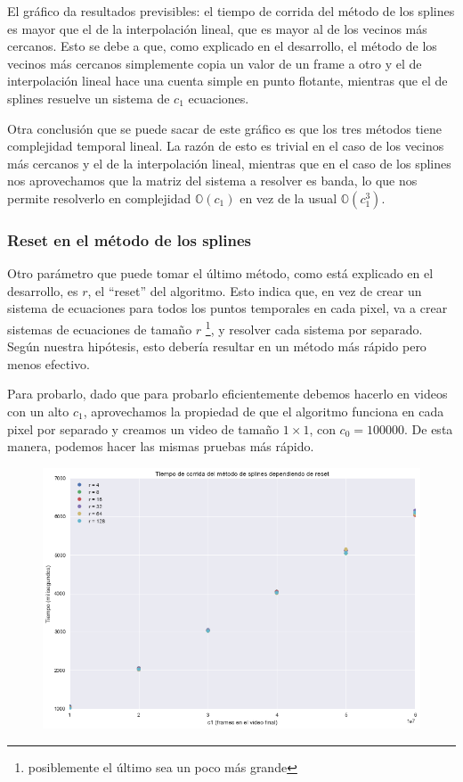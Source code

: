 El gr\'afico da resultados previsibles: el tiempo de corrida del m\'etodo de los
splines es mayor que el de la interpolaci\'on lineal, que es mayor al de los
vecinos m\'as cercanos. Esto se debe a que, como explicado en el desarrollo,
el m\'etodo de los vecinos m\'as cercanos simplemente copia un valor de un
frame a otro y el de interpolaci\'on lineal hace una cuenta simple en punto
flotante, mientras que el de splines resuelve un sistema de $c_1$ ecuaciones.

Otra conclusi\'on que se puede sacar de este gr\'afico es que los tres m\'etodos
tiene complejidad temporal lineal. La raz\'on de esto es trivial en el caso de los
vecinos m\'as cercanos y el de la interpolaci\'on lineal, mientras que en el
caso de los splines nos aprovechamos que la matriz del sistema a resolver es
banda, lo que nos permite resolverlo en complejidad $\mathbb{O}(c_1)$ en vez de
la usual $\mathbb{O}(c_1^3)$.

\subsubsection{Reset en el m\'etodo de los splines}

Otro par\'ametro que puede tomar el \'ultimo m\'etodo, como est\'a explicado en
el desarrollo, es $r$, el ``reset'' del algoritmo. Esto indica que, en vez de
crear un sistema de ecuaciones para todos los puntos temporales en cada pixel,
va a crear sistemas de ecuaciones de tama\~no $r$ \footnote{posiblemente el
\'ultimo sea un poco m\'as grande}, y resolver cada sistema por separado.
Seg\'un nuestra hip\'otesis, esto deber\'ia resultar en un m\'etodo m\'as r\'apido
pero menos efectivo.

Para probarlo, dado que para probarlo eficientemente debemos hacerlo en videos
con un alto $c_1$, aprovechamos la propiedad de que el algoritmo funciona en
cada pixel por separado y creamos un video de tama\~no $1 \times 1$, con $c_0 =
100000$. De esta manera, podemos hacer las mismas pruebas m\'as r\'apido.

\begin{figure}[H]
\centering
\includegraphics[width=.95\textwidth]{graficos/tiempo_reset.png}
\end{figure}

